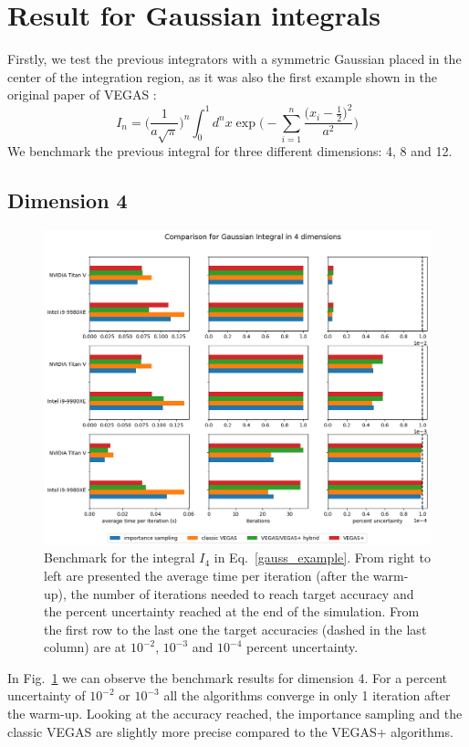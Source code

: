 \documentclass[../main/main.tex]{subfiles}
\begin{document}
\section{Result for Gaussian integrals}
Firstly, we test the previous integrators with a symmetric Gaussian placed in the center of the integration region, as it was also the first 
example shown in the original paper of VEGAS \cite{Lepage:1977sw}:
\begin{equation}
	\label{gauss_example}
	I_n = \bigg(\frac{1}{a \sqrt{\pi}}\bigg)^n \int_0^1 d^n x\exp{\bigg(-\sum_{i=1}^n \frac{\big( x_i - \frac{1}{2}\big)^2}{a^2}\bigg)}
\end{equation}
We benchmark the previous integral for three different dimensions: 4, 8 and 12.
\subsection{Dimension 4}

\begin{figure}
	\centering
	\includegraphics[width=\textwidth]{../images/gauss4d_final.png}
	\caption{Benchmark  for the integral $I_4$ in Eq.~\ref{gauss_example}. From right to left are presented the average time per iteration (after the warm-up), the number of iterations needed to reach target accuracy and the percent uncertainty reached at the end of the simulation. From the first row to the last one the target accuracies (dashed in the last column) are at $10^{-2}$, $10^{-3}$ and $10^{-4}$ percent uncertainty.}
	\label{gauss4d}
\end{figure}
In Fig.~\ref{gauss4d} we can observe the benchmark results for dimension 4.
For a percent uncertainty of $10^{-2}$  or $10^{-3}$ all the algorithms converge in only 1 iteration after the warm-up. Looking at the accuracy reached, the importance sampling and the classic VEGAS  are slightly more precise compared to the VEGAS+ algorithms.
\end{document}
